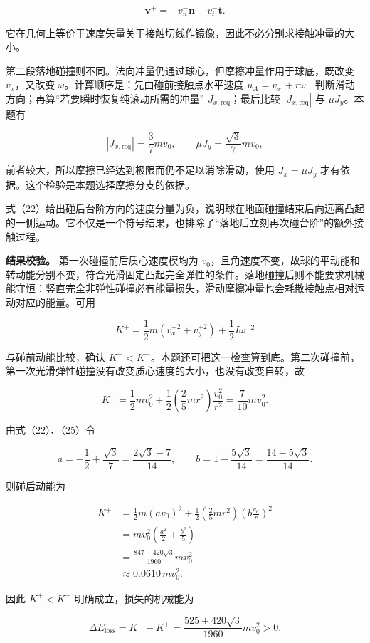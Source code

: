 \documentclass[12pt,a4paper,UTF8]{ctexart}
\begin{document}
\[
\boldsymbol v^+=-v_n^-\boldsymbol n+v_t^-\boldsymbol t.
\]

它在几何上等价于速度矢量关于接触切线作镜像，因此不必分别求接触冲量的大小。

第二段落地碰撞则不同。法向冲量仍通过球心，但摩擦冲量作用于球底，既改变
\(v_x\)，又改变 \(\omega\)。计算顺序是：先由碰前接触点水平速度
\(u_A^-=v_x^-+r\omega^-\)
判断滑动方向；再算``若要瞬时恢复纯滚动所需的冲量''
\(J_{x,\mathrm{req}}\)；最后比较 \(|J_{x,\mathrm{req}}|\) 与
\(\mu J_y\)。本题有

\[
|J_{x,\mathrm{req}}|=\frac37mv_0,
\qquad
\mu J_y=\frac{\sqrt3}{7}mv_0,
\]

前者较大，所以摩擦已经达到极限而仍不足以消除滑动，使用 \(J_x=\mu J_y\)
才有依据。这个检验是本题选择摩擦分支的依据。

式（22）给出碰后台阶方向的速度分量为负，说明球在地面碰撞结束后向远离凸起的一侧运动。它不仅是一个符号结果，也排除了``落地后立刻再次碰台阶''的额外接触过程。

\textbf{结果校验。} 第一次碰撞前后质心速度模均为
\(v_0\)，且角速度不变，故球的平动能和转动能分别不变，符合光滑固定凸起完全弹性的条件。落地碰撞后则不能要求机械能守恒：竖直完全非弹性碰撞必有能量损失，滑动摩擦冲量也会耗散接触点相对运动对应的能量。可用

\[
K^+=\frac12m(v_x^{+2}+v_y^{+2})+\frac12I\omega^{+2}
\]

与碰前动能比较，确认
\(K^+<K^-\)。本题还可把这一检查算到底。第二次碰撞前，第一次光滑弹性碰撞没有改变质心速度的大小，也没有改变自转，故

\[
K^-=\frac12mv_0^2+\frac12\left(\frac25mr^2\right)\frac{v_0^2}{r^2}
=\frac7{10}mv_0^2.
\]

由式（22）、（25）令

\[
a=-\frac12+\frac{\sqrt3}{7}
=\frac{2\sqrt3-7}{14},
\qquad
b=1-\frac{5\sqrt3}{14}
=\frac{14-5\sqrt3}{14}.
\]

则碰后动能为

\[
\begin{aligned}
K^+
&=\frac12m(av_0)^2
+\frac12\left(\frac25mr^2\right)
\left(b\frac{v_0}{r}\right)^2\\
&=mv_0^2\left(\frac{a^2}{2}+\frac{b^2}{5}\right)\\
&=\frac{847-420\sqrt3}{1960}mv_0^2\\
&\approx0.0610\,mv_0^2.
\end{aligned}
\]

因此 \(K^+<K^-\) 明确成立，损失的机械能为

\[
\Delta E_{\mathrm{loss}}
=K^--K^+
=\frac{525+420\sqrt3}{1960}mv_0^2>0.
\]
\end{document}
